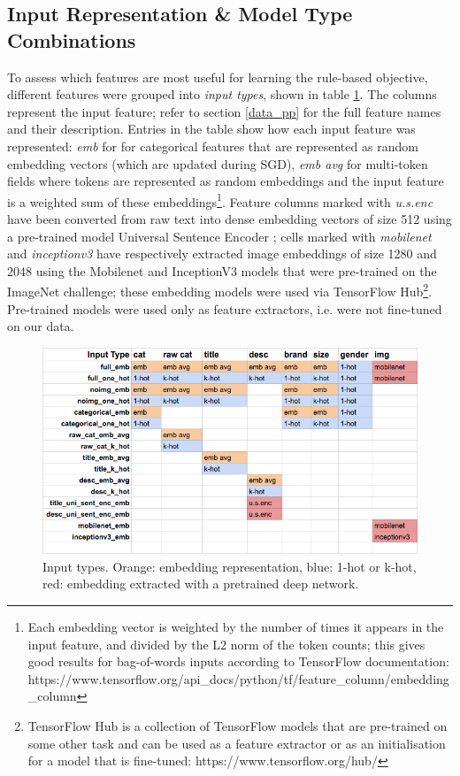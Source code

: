 \subsection{Input Representation \& Model Type Combinations}
\label{model_comb}

To assess which features are most useful for learning the rule-based objective, different features were grouped into \textit{input types}, shown in table \ref{input_types}.
The columns represent the input feature; refer to section \ref{data_pp} for the full feature names and their description.
Entries in the table show how each input feature was represented: \textit{emb} for for categorical features that are represented as random embedding vectors (which are updated during SGD), \textit{emb avg} for multi-token fields where tokens are represented as random embeddings and the input feature is a weighted sum of these embeddings\footnote{Each embedding vector is weighted by the number of times it appears in the input feature, and divided by the L2 norm of the token counts; this gives good results for bag-of-words inputs according to TensorFlow documentation:
\newline
https://www.tensorflow.org/api\_docs/python/tf/feature\_column/embedding\_column}.
Feature columns marked with \textit{u.s.enc} have been converted from raw text into dense embedding vectors of size 512 using a pre-trained model Universal Sentence Encoder \cite{uni_sent_enc}; cells marked with \textit{mobilenet} and \textit{inceptionv3} have respectively extracted image embeddings of size 1280 and 2048 using the Mobilenet \cite{mobilenet} and InceptionV3 \cite{inceptionv3} models that were pre-trained on the ImageNet challenge; these embedding models were used via TensorFlow Hub\footnote{TensorFlow Hub is a collection of TensorFlow models that are pre-trained on some other task and can be used as a feature extractor or as an initialisation for a model that is fine-tuned: https://www.tensorflow.org/hub/}.
Pre-trained models were used only as feature extractors, i.e. were not fine-tuned on our data.

\begin{figure}
  \centering
  \includegraphics[width=\linewidth]{figures/input_types}
  \caption{Input types. Orange: embedding representation, blue: 1-hot or k-hot, red: embedding extracted with a pretrained deep network.}
  \label{input_types}
\end{figure}

